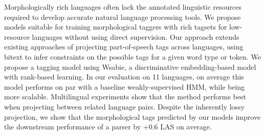 Morphologically rich languages often lack the annotated linguistic resources required to develop accurate natural language processing tools. We propose models suitable for training morphological taggers with rich tagsets for low-resource languages without using direct supervision. Our approach extends existing approaches of projecting part-of-speech tags across languages, using bitext to infer constraints on the possible tags for a given word type or token. We propose a tagging model using Wsabie, a discriminative embedding-based model with rank-based learning. In our evaluation on 11 languages, on average this model performs on par with a baseline weakly-supervised HMM, while being more scalable. Multilingual experiments show that the method performs best when projecting between related language pairs. Despite the inherently lossy projection, we show that the morphological tags predicted by our models improve the downstream performance of a parser by +0.6 LAS on average.
